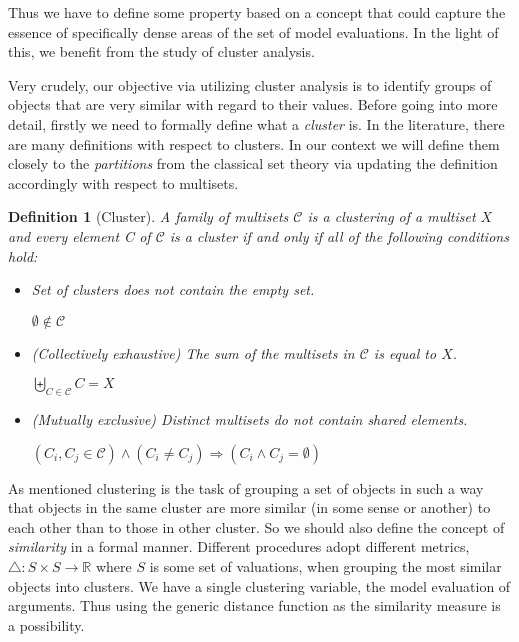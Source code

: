 \documentclass{article}
\newtheorem{definition}{Definition}
\newcommand{\real}{\mathbb{R}}  %
\newcommand{\clusterset}{\mathcal{C}}   %
\begin{document}
Thus we have to define some property based on a concept that could capture the essence of specifically dense areas of the set of model evaluations. In the light of this, we benefit from the study of cluster analysis.

Very crudely, our objective via utilizing cluster analysis is to identify groups of objects that are very similar with regard to their values. Before going into more detail, firstly we need to formally define what a \textit{cluster} is.  In the literature, there are many definitions with respect to clusters. In our context we will  define them closely to the \textit{partitions} from the classical set theory via updating the definition accordingly with respect to multisets. 

\begin{definition} [Cluster]
A family of multisets $\clusterset$ is a clustering of a multiset $X$ and every element C of $\clusterset$ is a cluster if and only if all of the following conditions hold:

\begin{itemize}
\item Set of clusters does not contain the empty set.
\begin{center}
$\emptyset \notin \clusterset$
\end{center}
\item (Collectively exhaustive) The sum of the multisets in $\clusterset$ is equal to $X$. 
\begin{center}
$\biguplus _{C \in \clusterset}C = X$
\end{center} 
\item (Mutually exclusive) Distinct multisets do not contain shared elements. %
\begin{center}
$(C_i, C_j \in \clusterset) \wedge (C_i \neq C_j) \Longrightarrow (C_i \wedge C_j = \emptyset)$ 
\end{center}

\end{itemize}
\end{definition}

As mentioned clustering is the task of grouping a set of objects in such a way that objects in the same cluster are more similar (in some sense or another) to each other than to those in other cluster. So we should also define the concept of \textit{similarity} in a formal manner. Different procedures adopt different metrics, $\bigtriangleup: S \times S \rightarrow \real$ where $S$ is some set of valuations, when grouping the most similar objects into clusters. We have a single clustering variable, the model evaluation of arguments. Thus using the generic distance function as the similarity measure is a possibility. 
\end{document}
